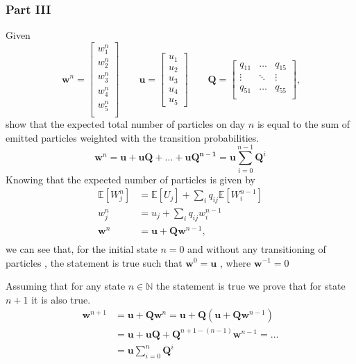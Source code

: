 \documentclass[11pt, a4paper]{article}
\begin{document}
\subsubsection*{Part III}
Given 
\[\
\mathbf w^n = \begin{bmatrix}w_1^n\\w_2^n\\w_3^n\\w_4^n\\w_5^n \\ \end{bmatrix} 
\qquad
\mathbf u = \begin{bmatrix}u_1\\u_2\\u_3\\u_4\\u_5\end{bmatrix} \qquad 
\mathbf Q = \begin{bmatrix}q_{11} & \dots & q_{15}  \\ 
\vdots & \ddots & \vdots  \\
q_{51} & \dots & q_{55}  \\

\end{bmatrix},
\]
show that the expected total number of particles on day $n$ is equal to the sum of emitted particles weighted with the transition probabilities.
\[
\mathbf{w}^n = \mathbf u + \mathbf{uQ} + \dots + \mathbf{uQ^{n-1}} = \mathbf u\sum_{i=0}^{n-1} \mathbf Q^i
\]
Knowing that the expected number of particles is given by
\[
\begin{aligned}
\mathbb{E}[W_j^n] &= \mathbb{E}[U_j] + \sum_i q_{ij}\mathbb{E}[W_i^{n-1}] \\
w_j^n &= u_j + \sum_i q_{ij}w_i^{n-1} \\
\mathbf w^n &= \mathbf u + \mathbf Q\mathbf w^{n-1}, \\
\end{aligned}
\]
we can see that, for the initial state $n=0$ and without any transitioning of particles , the statement is true such that $\mathbf w^0 = \mathbf u$ , where $\mathbf w^{-1} = 0$

Assuming that for any state $n\in\mathbb N$ the statement is true we prove that for state $n+1$ it is also true.
\[
\begin{aligned}
\mathbf w^{n+1} &= \mathbf u + \mathbf Q\mathbf w^{n} = \mathbf u + \mathbf Q(\mathbf u + \mathbf Q\mathbf w^{n-1}) \\ 
& =\mathbf u + \mathbf u \mathbf Q + \mathbf Q^{n+1 - (n-1)}\mathbf w^{n-1} = \ldots \\ 
& = \mathbf u \sum_{i=0}^{n} \mathbf Q^i
\end{aligned}
\]
\end{document}
